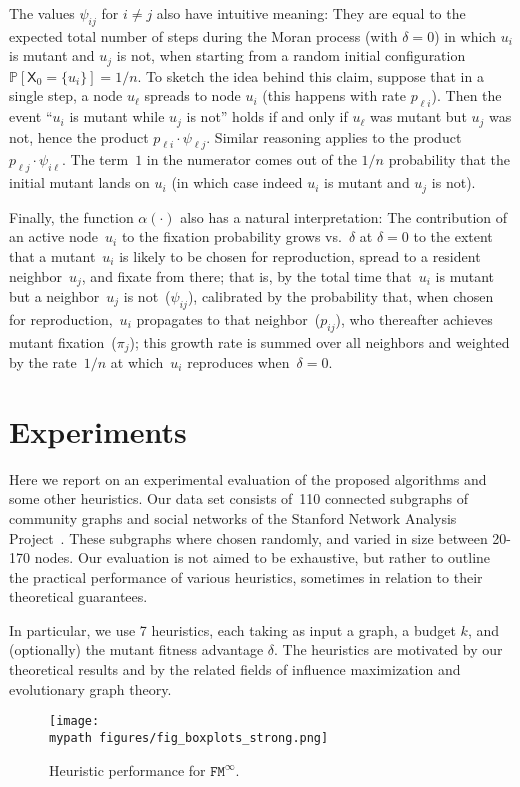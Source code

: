 \documentclass[letterpaper]{article}
\def\mypath{}
\def\Pr{\mathbb{P}}
\newcommand{\X}{\mathsf{X}}
\newcommand{\NodeActivationMoranStrong}{\texttt{FM}^{\infty}}
\newcommand{\FitAdv}{\delta}
\begin{document}
The values $\psi_{ij}$ for
$i\ne j$
also have intuitive meaning:
They are equal to the expected total number of steps during the Moran process (with $\FitAdv=0$)
in which $u_i$ is mutant and $u_j$ is not,
when starting from a random initial configuration $\Pr[\X_0=\{u_i\}]=1/n$.
To sketch the idea behind this claim,
suppose that in a single step, a node $u_\ell$ spreads to node $u_i$
(this happens with rate $p_{\ell i}$).
Then the event ``$u_i$ is mutant while $u_j$ is not'' holds
if and only if $u_\ell$ was mutant but $u_j$ was not, hence the product $p_{\ell i}\cdot \psi_{\ell j}$.
Similar reasoning applies to the product $p_{\ell j}\cdot \psi_{i\ell}$.
The term~$1$ in the numerator comes out of the $1/n$ probability that the initial mutant lands on $u_i$ (in which case indeed $u_i$ is mutant and $u_j$ is not).

Finally, the function $\alpha(\cdot)$ also has a natural interpretation:
The contribution of an active node~$u_i$ to the fixation probability grows vs.~$\FitAdv$ at $\FitAdv = 0$
to the extent that a mutant~$u_i$ is likely to be chosen for reproduction,
spread to a resident neighbor~$u_j$, and fixate from there;
that is, by the total time that~$u_i$ is mutant but a neighbor~$u_j$ is not~($\psi_{ij}$),
calibrated by the probability that, when chosen for reproduction,~$u_i$ propagates to that neighbor~($p_{ij}$),
who thereafter achieves mutant fixation~($\pi_j$);
this growth rate is summed over all neighbors and weighted by the rate~$1/n$ at which~$u_i$ reproduces when~$\FitAdv=0$.


\section{Experiments}\label{sec:experiments}

Here we report on an experimental evaluation of the proposed algorithms and some other heuristics.
Our data set consists of~110 connected subgraphs of community graphs and social networks of the Stanford Network Analysis Project~\cite{Leskovec2014}.
These subgraphs where chosen randomly, and varied in size between 20-170 nodes.
Our evaluation is not aimed to be exhaustive, but rather to outline the practical performance of various heuristics, sometimes in relation to their theoretical guarantees.

In particular, we use 7 heuristics, each taking as input a graph, a budget $k$, and (optionally) the mutant fitness advantage $\FitAdv$.
The heuristics are motivated by our theoretical results and by the related fields of influence maximization and evolutionary graph theory.
\begin{figure*}[!ht]
\centerline{
\texttt{[image: \\mypath figures/fig\_boxplots\_strong.png]}
}
\caption{Heuristic performance for $\NodeActivationMoranStrong$.}\label{fig:experiments_strong}
\end{figure*}
\end{document}
